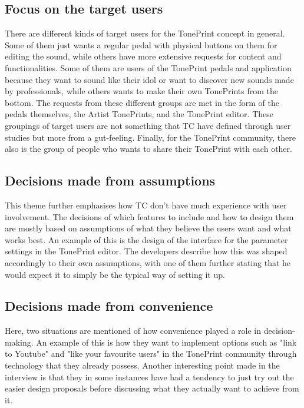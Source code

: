 \subsection*{Focus on the target users}
\label{App:ThemeFocusOnTargetUsers}
There are different kinds of target users for the TonePrint concept in general. Some of them just wants a regular pedal with physical buttons on them for editing the sound, while others have more extensive requests for content and functionalities. Some of them are users of the TonePrint pedals and application because they want to sound like their idol or want to discover new sounds made by professionals, while others wants to make their own TonePrints from the bottom. The requests from these different groups are met in the form of the pedals themselves, the Artist TonePrints, and the TonePrint editor. These groupings of target users are not something that TC have defined through user studies but more from a gut-feeling. Finally, for the TonePrint community, there also is the group of people who wants to share their TonePrint with each other.

\subsection*{Decisions made from assumptions} 
\label{App:ThemeDecisionsMadeFromAssumptions}
This theme further emphasises how TC don't have much experience with user involvement. The decisions of which features to include and how to design them are mostly based on assumptions of what they believe the users want and what works best. An example of this is the design of the interface for the parameter settings in the TonePrint editor. The developers describe how this was shaped accordingly to their own assumptions, with one of them further stating that he would expect it to simply be the typical way of setting it up.

\subsection*{Decisions made from convenience}
\label{App:ThemeDecisionsMadeFromConvenience}
Here, two situations are mentioned of how convenience played a role in decision-making. An example of this is how they want to implement options such as "link to Youtube" and "like your favourite users" in the TonePrint community through technology that they already possess. Another interesting point made in the interview is that they in some instances have had a tendency to just try out the easier design proposals before discussing what they actually want to achieve from it.

